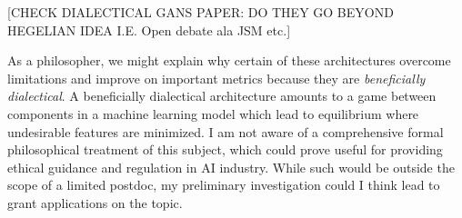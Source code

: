 \documentclass[11pt, oneside]{article}   	%
\begin{document}
[CHECK DIALECTICAL GANS PAPER: DO THEY GO BEYOND HEGELIAN IDEA I.E. Open debate ala JSM etc.]


As a philosopher, we might explain why certain of these architectures overcome limitations and improve on important metrics because they are \emph{beneficially dialectical}.  A beneficially dialectical architecture amounts to a game between components in a machine learning model which lead to equilibrium where undesirable features are minimized.  I am not aware of a comprehensive formal philosophical treatment of this subject, which could prove useful for providing ethical guidance and regulation in AI industry.  While such would be outside the scope of a limited postdoc, my preliminary investigation could I think lead to grant applications on the topic.








\end{document}
